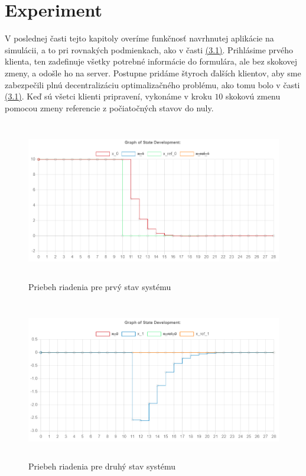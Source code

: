 \section{Experiment}
V poslednej časti tejto kapitoly overíme funkčnosť navrhnutej aplikácie na simulácii, a to pri rovnakých podmienkach, ako v časti \hyperref[sec:HB]{(3.1)}. Prihlásime prvého klienta, ten zadefinuje všetky potrebné informácie do formulára, ale bez skokovej zmeny, a odošle ho na server. Postupne pridáme štyroch ďalších klientov, aby sme zabezpečili plnú decentralizáciu optimalizačného problému, ako tomu bolo v časti \hyperref[sec:HB]{(3.1)}. Keď sú všetci klienti pripravení, vykonáme v kroku $10$ skokovú zmenu pomocou zmeny referencie z počiatočných stavov do nuly.
\begin{figure}[H]
	\centering
	\includegraphics[width=13cm,height=7cm]{images/Hmotny_bod_apk/x0}
	\caption{Priebeh riadenia pre prvý stav systému}
\end{figure}
\begin{figure}[H]
	\centering
	\includegraphics[width=13cm,height=7cm]{images/Hmotny_bod_apk/x1}
	\caption{Priebeh riadenia pre druhý stav systému}
\end{figure}
